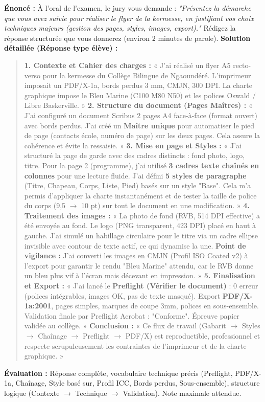 \documentclass[11pt]{article}
\begin{document}
\begin{exoresolu}
    \textbf{Énoncé :} À l'oral de l'examen, le jury vous demande : \textit{"Présentez la démarche que vous avez suivie pour réaliser le flyer de la kermesse, en justifiant vos choix techniques majeurs (gestion des pages, styles, images, export)."} Rédigez la réponse structurée que vous donnerez (environ 2 minutes de parole).
    \tcblower
    \textbf{Solution détaillée (Réponse type élève) :}
    \begin{quote}
        \textbf{1. Contexte et Cahier des charges :} « J'ai réalisé un flyer A5 recto-verso pour la kermesse du Collège Bilingue de Ngaoundéré. L'imprimeur imposait un PDF/X-1a, bords perdus 3 mm, CMJN, 300 DPI. La charte graphique impose le Bleu Marine (C100 M80 N50) et les polices Oswald / Libre Baskerville. »
        \textbf{2. Structure du document (Pages Maîtres) :} « J'ai configuré un document Scribus 2 pages A4 face-à-face (format ouvert) avec bords perdus. J'ai créé un \textbf{Maître unique} pour automatiser le pied de page (contacts école, numéro de page) sur les deux pages. Cela assure la cohérence et évite la ressaisie. »
        \textbf{3. Mise en page et Styles :} « J'ai structuré la page de garde avec des cadres distincts : fond photo, logo, titre. Pour la page 2 (programme), j'ai utilisé \textbf{3 cadres texte chaînés en colonnes} pour une lecture fluide. J'ai défini \textbf{5 styles de paragraphe} (Titre, Chapeau, Corps, Liste, Pied) basés sur un style "Base". Cela m'a permis d'appliquer la charte instantanément et de tester la taille de police du corps (9,5 $\rightarrow$ 10 pt) sur tout le document en une modification. »
        \textbf{4. Traitement des images :} « La photo de fond (RVB, 514 DPI effective) a été envoyée au fond. Le logo (PNG transparent, 423 DPI) placé en haut à gauche. J'ai simulé un habillage circulaire pour le titre via un cadre ellipse invisible avec contour de texte actif, ce qui dynamise la une. \textbf{Point de vigilance :} J'ai converti les images en CMJN (Profil ISO Coated v2) à l'export pour garantir le rendu "Bleu Marine" attendu, car le RVB donne un bleu plus vif à l'écran mais décevant en impression. »
        \textbf{5. Finalisation et Export :} « J'ai lancé le \textbf{Preflight (Vérifier le document)} : 0 erreur (polices intégrables, images OK, pas de texte masqué). Export \textbf{PDF/X-1a:2001}, pages simples, marques de coupe 3mm, polices en sous-ensemble. Validation finale par Preflight Acrobat : "Conforme". Épreuve papier validée au collège. »
        \textbf{Conclusion :} « Ce flux de travail (Gabarit $\rightarrow$ Styles $\rightarrow$ Chaînage $\rightarrow$ Preflight $\rightarrow$ PDF/X) est reproductible, professionnel et respecte scrupuleusement les contraintes de l'imprimeur et de la charte graphique. »
    \end{quote}
    \textbf{Évaluation :} Réponse complète, vocabulaire technique précis (Preflight, PDF/X-1a, Chaînage, Style basé sur, Profil ICC, Bords perdus, Sous-ensemble), structure logique (Contexte $\rightarrow$ Technique $\rightarrow$ Validation). Note maximale attendue.
\end{exoresolu}
\end{document}
